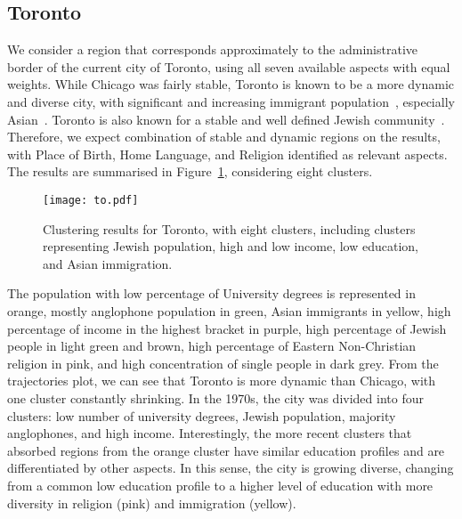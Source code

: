 \subsection{Toronto}

We consider a region that corresponds approximately to the administrative border
of the current city of Toronto, using all seven available aspects with equal
weights. While Chicago was fairly stable, Toronto is known to be a more dynamic
and diverse city, with significant and increasing immigrant
population~\citep{hulchanski2007three,Fong2011}, especially
Asian~\citep{Fong2003}. Toronto is also known for a stable and well defined
Jewish community~\citep{Harold2018, Fong2011}. Therefore, we expect 
combination of stable and dynamic regions on the results, with Place of Birth,
Home Language, and Religion identified as relevant aspects. The results are
summarised in Figure~\ref{fig:to}, considering eight clusters.

\begin{figure}
    \centering 
    \texttt{[image: to.pdf]}
    \caption{Clustering results for Toronto, with eight clusters, including
    clusters representing Jewish population, high and low income, low education,
    and Asian immigration.\label{fig:to}}
\end{figure}

The population with low percentage of University degrees is represented in
orange, mostly anglophone population in green, Asian immigrants in yellow, high
percentage of income in the highest bracket in purple, high percentage of Jewish
people in light green and brown, high percentage of Eastern Non-Christian
religion in pink, and high concentration of single people in dark grey. From the
trajectories plot, we can see that Toronto is more dynamic than Chicago, with
one cluster constantly shrinking. In the 1970s, the city was divided into four
clusters: low number of university degrees, Jewish population, majority
anglophones, and high income. Interestingly, the more recent clusters that
absorbed regions from the orange cluster have similar education profiles and are
differentiated by other aspects. In this sense, the city is growing diverse,
changing from a common low education profile to a higher level of education with
more diversity in religion (pink) and immigration (yellow).


